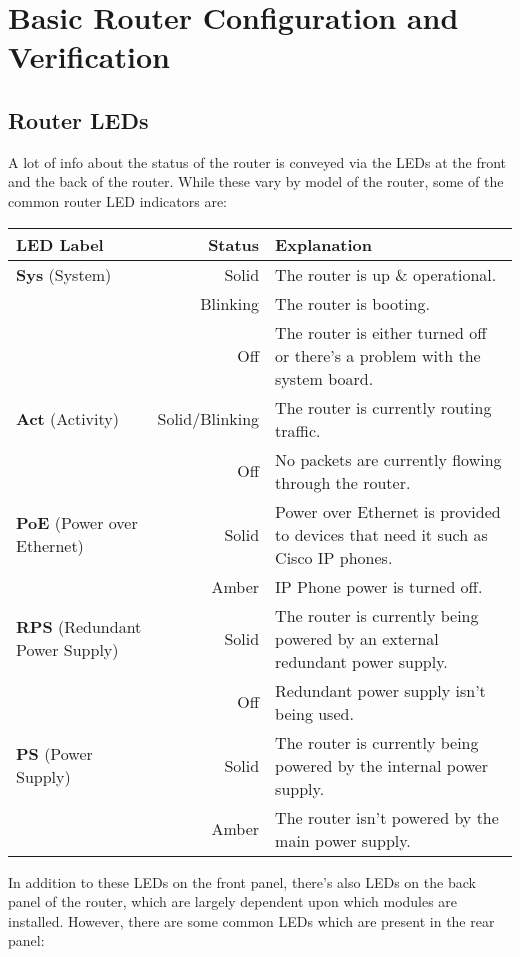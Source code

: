 \chapter{Basic Router Configuration and Verification}
\section{Router LEDs}
A lot of info about the status of the router is conveyed via the LEDs at the front and the back of the router. While these vary by model of the router, some of the common router LED indicators are:
\vspace{-10pt}
\noindent
\begin{center}
	\begin{tabular}{m{}rm{}}
		\toprule
		\textbf{LED Label} &\textbf{Status} &\textbf{Explanation} \\
		\midrule
		\textbf{Sys} (System) &Solid &The router is up \& operational. \\
		&Blinking &The router is booting. \\
		&Off &The router is either turned off or there's a problem with the system board. \\
		\midrule
		\textbf{Act} (Activity) &Solid/Blinking &The router is currently routing traffic. \\
		&Off &No packets are currently flowing through the router. \\
		\midrule
		\textbf{PoE} (Power over Ethernet) &Solid &Power over Ethernet is provided to devices that need it such as Cisco IP phones. \\
		&Amber &IP Phone power is turned off. \\
		\midrule
		\textbf{RPS} (Redundant Power Supply) &Solid &The router is currently being powered by an external redundant power supply. \\
		&Off &Redundant power supply isn't being used. \\
		\midrule
		\textbf{PS} (Power Supply) &Solid &The router is currently being powered by the internal power supply. \\
		&Amber &The router isn't powered by the main power supply. \\
		\bottomrule
	\end{tabular}
\end{center}
\noindent
In addition to these LEDs on the front panel, there's also LEDs on the back panel of the router, which are largely dependent upon which modules are installed. However, there are some common LEDs which are present in the rear panel: 

